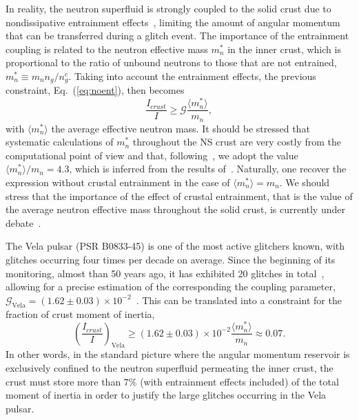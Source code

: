 In reality, the neutron superfluid is strongly coupled to the solid crust due
to nondissipative entrainment effects~\cite{Chamel2013}, limiting the amount of
angular momentum that can be transferred during a glitch event. The importance
of the entrainment coupling is related to the neutron effective mass $m_n^*$ in
the inner crust, which is proportional to the ratio of unbound neutrons to 
those that are not entrained, $m_n^* \equiv m_n n_g/n_g^c$. Taking into 
account the entrainment effects, the previous constraint, Eq.~(\ref{eq:noent}), 
then becomes~\cite{Andersson2012}
%
\begin{equation}
  \frac{I_{crust}}{I} \geq \mathcal{G}\frac{\langle m_n^*
  \rangle}{m_n},\label{eq:ifrac_g}
\end{equation}
%
with $\langle m_n^* \rangle$ the average effective neutron mass.
It should be stressed that systematic calculations of $m_n^*$ throughout 
the NS crust are very costly from the computational point of view and that,
following~\cite{Andersson2012,Piekarewicz2014}, we adopt the 
value $\langle m_n^* \rangle /m_n = 4.3$, which is inferred from the 
results of~\cite{Chamel2012}. Naturally, one recover the expression without 
crustal entrainment in the case of $\langle m_n^* \rangle = m_n$. We should 
stress that the importance of the effect of crustal entrainment, that is the 
value of the average neutron effective mass throughout the solid crust, is 
currently under debate~\cite{Martin2016,Watanabe2017}.

The Vela pulsar (PSR B0833-45) is one of the most active glitchers known, with
glitches occurring four times per decade on average. Since the beginning of its 
monitoring, almost than 50 years ago, it has exhibited 20 glitches in
total~\cite{Glitches}, allowing for a precise estimation of the corresponding 
the coupling parameter, $\mathcal{G}_{\text{Vela}} = (1.62 \pm 0.03) \times
10^{-2}$~\cite{Ho2015}. This can be translated into a constraint for 
the fraction of crust moment of inertia,
%
\begin{equation}
  \left(\frac{I_{crust}}{I}\right)_{\text{Vela}} \geq (1.62 \pm 0.03) \times 10^{-2}
  \frac{\langle m_n^* \rangle}{m_n} \approx 0.07.
\end{equation}
%
In other words, in the standard picture where the angular momentum reservoir is 
exclusively confined to the neutron superfluid permeating the inner crust, the 
crust must store more than $7\%$ (with entrainment effects included) of the 
total moment of inertia in order to justify the large glitches occurring in the 
Vela pulsar.

